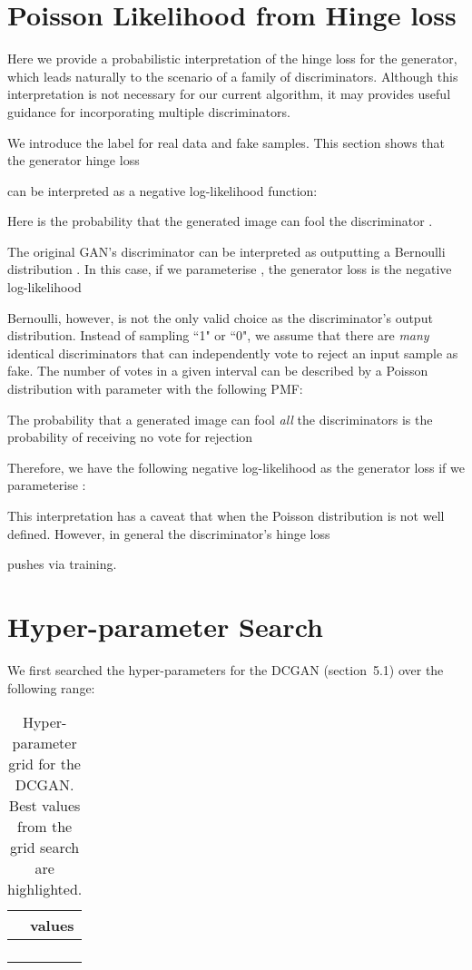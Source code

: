 \documentclass{article} \usepackage{iclr2020_conference,times}
\begin{document}
\section{Poisson Likelihood from Hinge loss}
\label{app:poisson-ll}

Here we provide a probabilistic interpretation of the hinge loss for the generator, which leads naturally to the scenario of a family of discriminators. Although this interpretation is not necessary for our current algorithm, it may provides useful guidance for incorporating multiple discriminators.

We introduce the label  for real data and  fake samples.
This section shows that the generator hinge loss

can be interpreted as a negative log-likelihood function:

Here  is the probability that the  generated image  can fool the discriminator .

The original GAN's discriminator can be interpreted as outputting a Bernoulli distribution . In this case, if we parameterise , the generator loss is the negative log-likelihood


Bernoulli, however, is not the only valid choice as the discriminator's output distribution. Instead of sampling ``1" or ``0", we assume that there are \emph{many} identical discriminators that can independently vote to reject an input sample as fake. The number of votes  in a given interval can be described by a Poisson distribution with parameter  with the following PMF:


The probability that a generated image can fool \emph{all} the discriminators is the probability of  receiving no vote for rejection

Therefore, we have the following negative log-likelihood as the generator loss if we parameterise :

This interpretation has a caveat that when  the Poisson distribution is not well defined. However, in general the discriminator's hinge loss

pushes  via training.

\section{Hyper-parameter Search}
\label{app:hyper}

We first searched the hyper-parameters for the DCGAN (section~5.1) over the following range:
\begin{table}[htb]
\caption{Hyper-parameter grid for the DCGAN. Best values from the grid search are highlighted.}
\begin{center}
\begin{tabular}{l|c}
         & values \\
\hline
  &  \\
  &  \\
  &  \\
  &  \\
\end{tabular}
\end{center}
\end{table}
\end{document}
